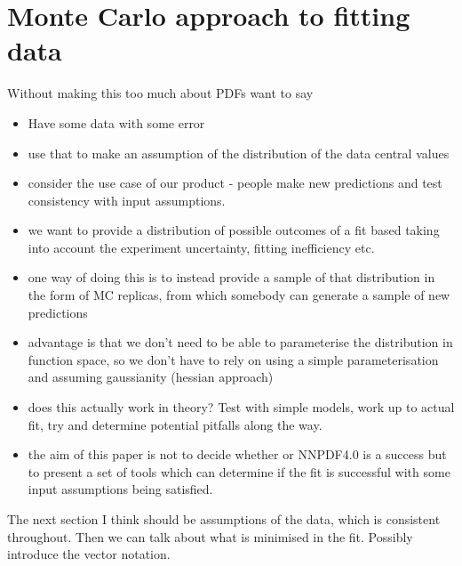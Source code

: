\section{Monte Carlo approach to fitting data}
Without making this too much about PDFs want to say
\begin{itemize}
    \item Have some data with some error
    \item use that to make an assumption of the distribution of the data central values
    \item consider the use case of our product - people make new predictions and
    test consistency with input assumptions.
    \item we want to provide a distribution of possible outcomes of a fit based
    taking into account the experiment uncertainty, fitting inefficiency etc.
    \item one way of doing this is to instead provide a sample of that
    distribution in the form of MC replicas, from which somebody can generate
    a sample of new predictions
    \item advantage is that we don't need to be able to parameterise the
    distribution in function space, so we don't have to rely on using a simple
    parameterisation and assuming gaussianity (hessian approach)
    \item does this actually work in theory? Test with simple models, work up
    to actual fit, try and determine potential pitfalls along the way.
    \item the aim of this paper is not to decide whether or NNPDF4.0 is a success
    but to present a set of tools which can determine if the fit is successful
    with some input assumptions being satisfied.
\end{itemize}
The next section I think should be assumptions of the data, which is consistent
throughout. Then we can talk about what is minimised in the fit. Possibly
introduce the vector notation.

